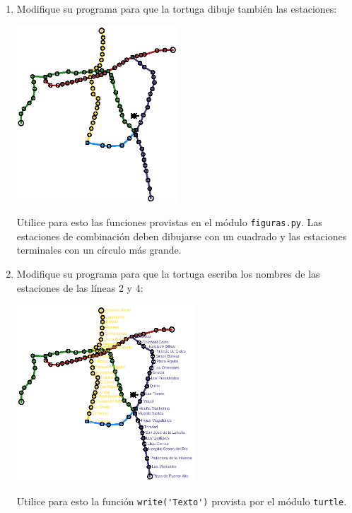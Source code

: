 \begin{enumerate}[leftmargin=0pt,label=\emph{\alph*})]
  \newpage
  \item
    Modifique su programa para que la tortuga
    dibuje también las estaciones:

    \includegraphics[height=250px]{metro/red2}

    Utilice para esto las funciones provistas
    en el módulo \texttt{figuras.py}.
    Las estaciones de combinación deben dibujarse
    con un cuadrado
    y las estaciones terminales
    con un círculo más grande.

  \newpage
  \item
    Modifique su programa para que la tortuga
    escriba los nombres de las estaciones
    de las líneas 2 y 4:

    \includegraphics[height=250px]{metro/red3}

    Utilice para esto la función \lstinline!write('Texto')!
    provista por el módulo \verb!turtle!.

\end{enumerate}


